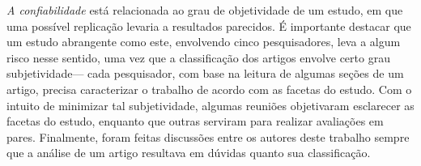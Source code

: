 \noindent
\emph{A confiabilidade} est\'{a} relacionada ao grau de objetividade de
um estudo, em que uma poss\'{i}vel replica\c c\~{a}o levaria a
resultados parecidos. \'{E} importante destacar que um estudo abrangente como este,
envolvendo cinco pesquisadores, leva a algum risco nesse sentido,
uma vez que a classifica\c c\~{a}o dos artigos envolve certo grau
subjetividade--- cada pesquisador, com base na leitura de algumas
se\c c\~{o}es de um artigo, precisa caracterizar o trabalho de acordo
com as facetas do estudo. Com o intuito de minimizar tal subjetividade,
algumas reuni\~{o}es objetivaram esclarecer as facetas do estudo,
enquanto que outras serviram para realizar avalia\c c\~{o}es em
pares. Finalmente, foram feitas discuss\~{o}es entre os autores deste
trabalho sempre que a an\'{a}lise de um artigo resultava em d\'{u}vidas
quanto sua classifica\c c\~{a}o. 